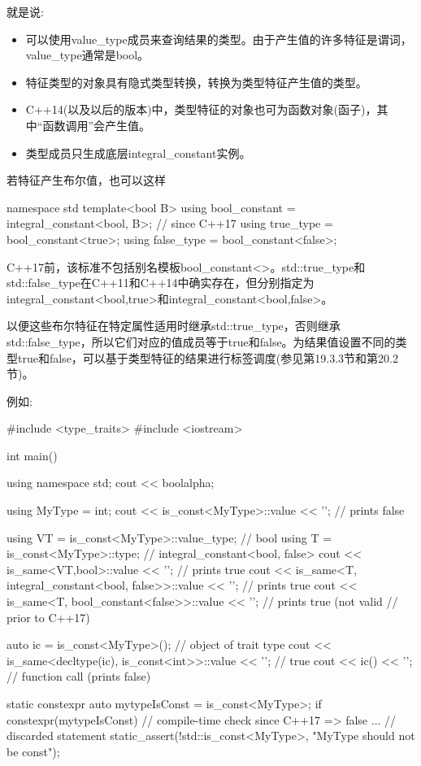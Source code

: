 就是说:

\begin{itemize}
\item 
可以使用value\_type成员来查询结果的类型。由于产生值的许多特征是谓词，value\_type通常是bool。

\item 
特征类型的对象具有隐式类型转换，转换为类型特征产生值的类型。

\item 
C++14(以及以后的版本)中，类型特征的对象也可为函数对象(函子)，其中“函数调用”会产生值。

\item 
类型成员只生成底层integral\_constant实例。
\end{itemize}

若特征产生布尔值，也可以这样

\begin{cpp}
	namespace std {
		template<bool B>
		using bool_constant = integral_constant<bool, B>; // since C++17
		using true_type = bool_constant<true>;
		using false_type = bool_constant<false>;
	}
\end{cpp}

\begin{notice}C++17前，该标准不包括别名模板bool\_constant<>。std::true\_type和std::false\_type在C++11和C++14中确实存在，但分别指定为integral\_constant<bool,true>和integral\_constant<bool,false>。
\end{notice}

以便这些布尔特征在特定属性适用时继承std::true\_type，否则继承std::false\_type，所以它们对应的值成员等于true和false。为结果值设置不同的类型true和false，可以基于类型特征的结果进行标签调度(参见第19.3.3节和第20.2节)。

例如:

\begin{cpp}
#include <type_traits>
#include <iostream>

int main()
{
	using namespace std;
	cout << boolalpha;
	
	using MyType = int;
	cout << is_const<MyType>::value << ’\n’; // prints false
	
	using VT = is_const<MyType>::value_type; // bool
	using T = is_const<MyType>::type; // integral_constant<bool, false>
	cout << is_same<VT,bool>::value << ’\n’; // prints true
	cout << is_same<T, integral_constant<bool, false>>::value
		<< ’\n’; // prints true
	cout << is_same<T, bool_constant<false>>::value
		<< ’\n’; // prints true (not valid	
				// prior to C++17)
				
	auto ic = is_const<MyType>(); // object of trait type
	cout << is_same<decltype(ic), is_const<int>>::value << ’\n’; // true
	cout << ic() << ’\n’; // function call (prints false)
	
	static constexpr auto mytypeIsConst = is_const<MyType>{};
	if constexpr(mytypeIsConst) { // compile-time check since C++17 => false
		... // discarded statement
	}
	static_assert(!std::is_const<MyType>{}, "MyType should not be const");
}
\end{cpp}

